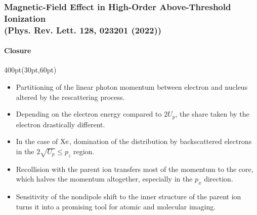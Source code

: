 \begin{frame}
\frametitle{Magnetic-Field Effect in High-Order Above-Threshold Ionization \\
\small (Phys. Rev. Lett. 128, 023201 (2022))}
\framesubtitle{Closure}

\small
\begin{textblock*}{400pt}(30pt,60pt)
\begin{itemize}
\footnotesize
\item Partitioning of the linear photon momentum between 
electron and nucleus altered by the rescattering process. 
\item Depending on the electron energy compared to $2U_p$, the share 
taken by the electron drastically different.
\item In the case of $\rm Xe$, domination of the distribution by 
backscattered electrons in the  $2\sqrt{U_p} \leqslant p_z$ region.
\item Recollision with the parent ion transfers 
most of the momentum to the core, which halves the momentum altogether,
especially in the $p_x$ direction. 

\vspace{20pt}

\item Sensitivity of the nondipole shift to the inner structure 
of the parent ion turns it into a promising tool 
for atomic and molecular imaging.
\end{itemize}
\end{textblock*}



\end{frame}

